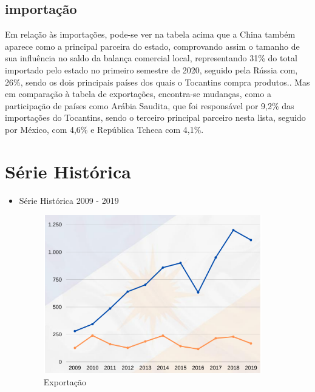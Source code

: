 \subsection {importação}
\par Em relação às importações, pode-se ver na tabela acima que a China também aparece como a principal parceira do estado, comprovando assim o tamanho de sua influência no saldo da balança comercial local, representando 31\% do total importado pelo estado no primeiro semestre de 2020, seguido pela Rússia com, 26\%, sendo os dois principais países dos quais o Tocantins compra produtos.. Mas em comparação à tabela de exportações, encontra-se mudanças, como a participação de países como Arábia Saudita, que foi responsável por 9,2\% das importações do Tocantins, sendo o terceiro principal parceiro nesta lista, seguido por México, com 4,6\% e República Tcheca com 4,1\%.

\section{Série Histórica}
\begin{itemize}
	\item Série Histórica 2009 - 2019
	\begin{figure}[h]
	\caption{Exportação}
	\includegraphics[width=\linewidth]{fig/total.png}
\end{figure}
\end{itemize}

